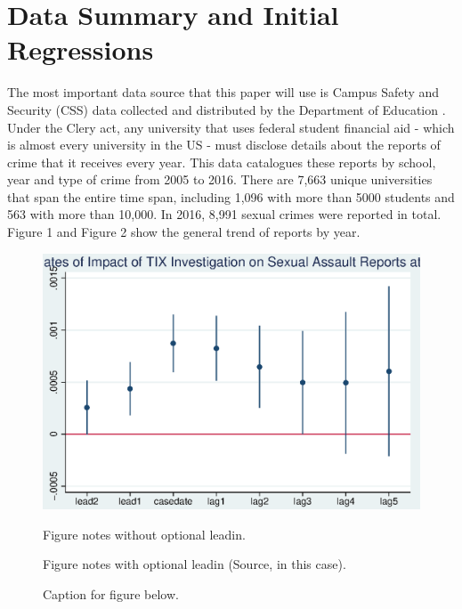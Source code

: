 \documentclass[AER]{AEA}
\begin{document}
\section{Data Summary and Initial Regressions}

The most important data source that this paper will use is Campus Safety and Security (CSS) data collected and distributed by the Department of Education . Under the Clery act, any university that uses federal student financial aid - which is almost every university in the US - must disclose details about the reports of crime that it receives every year. This data catalogues these reports by school, year and type of crime from 2005 to 2016. There are 7,663 unique universities that span the entire time span, including 1,096 with more than 5000 students and 563 with more than 10,000. In 2016, 8,991 sexual crimes were reported in total. Figure 1 and Figure 2 show the general trend of reports by year.  

\clearpage




\clearpage
\appendix


\begin{figure}

\includegraphics[width=4.9in]{figures/school_reports.eps}

\caption{Caption for figure below.}
\begin{figurenotes}
Figure notes without optional leadin.
\end{figurenotes}
\begin{figurenotes}[Source]
Figure notes with optional leadin (Source, in this case).
\end{figurenotes}
\end{figure}
\end{document}
